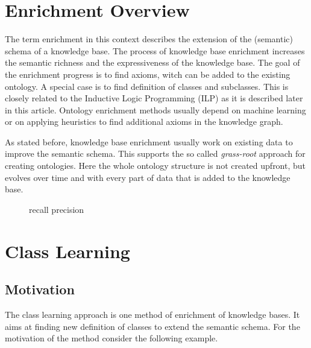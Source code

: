 \section{Enrichment Overview}
The term enrichment in this context describes the extension of the (semantic)
schema of a knowledge base. The process of knowledge base enrichment increases the
semantic richness and the expressiveness of the knowledge base. 
The goal of the enrichment progress is to find axioms, witch can be added to the
existing ontology. A special case is to find definition of classes and
subclasses. This is closely related to the Inductive Logic Programming (ILP) as
it is described later in this article.
Ontology enrichment methods usually depend on machine learning or on applying
heuristics to find additional axioms in the knowledge graph.\cite{paper2}

As stated before, knowledge base enrichment usually work on existing data to
improve the semantic schema. This supports the so called \emph{grass-root}
approach for creating ontologies. Here the whole ontology structure is not
created upfront, but evolves over time and with every part of data that is added to the
knowledge base.\cite{paper2}

% 
% 

\begin{figure}
\centering
\label{venn}
\caption{recall precision}
\end{figure}



\section{Class Learning}
\subsection{Motivation}
The class learning approach is one method of enrichment of knowledge bases. It
aims at finding new definition of classes to extend the semantic schema. For the
motivation of the method consider the following example.

